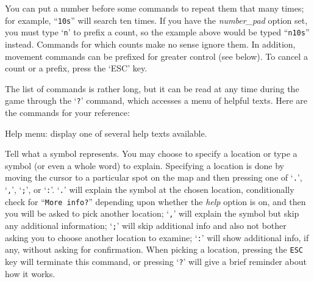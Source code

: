 You can put a number before some commands to repeat them that many
times; for example, ``{\tt 10s}'' will search ten times.  If you have the
{\it number\_pad\/}
option set, you must type `{\tt n}' to prefix a count, so the example above
would be typed ``{\tt n10s}'' instead.  Commands for which counts make no
sense ignore them.  In addition, movement commands can be prefixed for
greater control (see below).  To cancel a count or a prefix, press the
`ESC' key.

The list of commands is rather long, but it can be read at any time
during the game through the `{\tt ?}' command, which accesses a menu of
helpful texts.  Here are the commands for your reference:

\blist{}
\item[\tb{?}]
Help menu:  display one of several help texts available.
\item[\tb{/}]
Tell what a symbol represents.  You may choose to specify a location
or type a symbol (or even a whole word) to explain.
Specifying a location is done by moving the cursor to a particular spot
on the map and then pressing one of `{\tt .}', `{\tt ,}', `{\tt ;}',
or `{\tt :}'.  `{\tt .}' will explain the symbol at the chosen location,
conditionally check for ``{\tt More info?}'' depending upon whether the
{\it help\/}
option is on, and then you will be asked to pick another location;
`{\tt ,}' will explain the symbol but skip any additional
information; `{\tt ;}' will skip additional info and also not bother asking
you to choose another location to examine; `{\tt :}' will show additional
info, if any, without asking for confirmation.  When picking a location,
pressing the {\tt ESC} key will terminate this command, or pressing `{\tt ?}'
will give a brief reminder about how it works.

